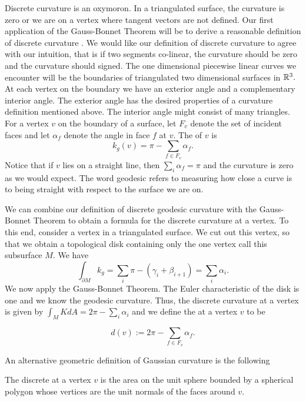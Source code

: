 Discrete curvature is an oxymoron. In a triangulated surface,
the curvature is zero or we are on a vertex where tangent vectors are not defined.
Our first application of the Gauss-Bonnet Theorem will be to derive a reasonable definition of discrete curvature \cite{Crane:2013}.
We would like our definition of discrete curvature to agree with
our intuition, that is if two segments co-linear, the curvature should be zero
and the curvature should signed.
The one dimensional piecewise linear curves we encounter will be the boundaries
of triangulated two dimensional surfaces in $\mathbb{R}^3.$
At each vertex on the boundary we have an exterior angle and a complementary interior angle.
The exterior angle has the desired properties of a curvature definition mentioned above.
The interior angle might consist of many triangles.
For a vertex $v$ on the boundary of a surface, 
let $F_v$  denote the set of incident faces and let
$\alpha_f$ denote the angle in face $f$ at $v$.
The 
of $v$  is
$$k_{g}(v)= \pi-\sum_{f\in F_v}\alpha_f.$$
Notice that if $v$ lies on a straight line, then $\sum_{i}\alpha_f=\pi$
and the curvature is zero as we would expect.
The word geodesic refers to measuring how close
a curve is to being straight with respect to the surface we are on.

We can combine our definition of discrete geodesic curvature
with the Gauss-Bonnet Theorem to obtain a formula for the discrete
curvature at a vertex.
To this end, consider a vertex in a triangulated surface.
We cut out this vertex, so that we obtain a topological disk containing
only the one vertex call this subsurface $M$. We have
$$\int_{\partial M}k_g=\sum_i\pi -(\gamma_i+\beta_{i+1})=\sum_i\alpha_i.$$
We now apply the Gauss-Bonnet Theorem.
The Euler characteristic of the disk is one and we know the geodesic curvature.
Thus, the discrete curvature at a vertex is given by
$\int_M K dA=2\pi-\sum_i\alpha_i$ and we define
the  at a vertex $v$ to be

\begin{equation} \label{eqn:discrete-gaussian}
d(v):=2\pi -\sum_{f\in F_v}\alpha_f.
\end{equation}

An alternative geometric definition of Gaussian curvature is the following

\begin{definition}\label{def:discrete-curvature-vertex}

The discrete  at a vertex $v$ is the area on the unit 
sphere bounded by a spherical polygon whose vertices are the unit normals of 
the faces around $v$.

\end{definition}

